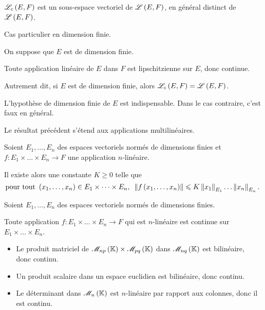 \begin{prop}
\(\mathscr{L}_c\left(E,F\right)\) est un sous-espace vectoriel de \(\mathscr{L}\left(E,F\right)\), en général distinct de \(\mathscr{L}\left(E,F\right)\).
\end{prop}

Cas particulier en dimension finie.

\begin{theo}
On suppose que \(E\) est de dimension finie.

Toute application linéaire de \(E\) dans \(F\) est lipschitzienne sur \(E\), donc continue.

Autrement dit, si \(E\) est de dimension finie, alors \(\mathscr{L}_c\left(E,F\right)=\mathscr{L}\left(E,F\right)\).
\end{theo}

\begin{rem}
L'hypothèse de dimension finie de \(E\) est indispensable. Dans le cas contraire, c'est faux en général.
\end{rem}

Le résultat précédent s'étend aux applications multilinéaires.

\begin{theo}
Soient \(E_1,\dots,E_n\) des espaces vectoriels normés de dimensions finies et \(f:E_1\times\dots\times E_n\to F\) une application \(n\)-linéaire.

Il existe alors une constante \(K\geq0\) telle que \[\quantifs{\tpt\paren{x_1,\dots,x_n}\in E_1\times\dots\times E_n}\norme{f\paren{x_1,\dots,x_n}}\leq K\norme{x_1}_{E_1}\dots\norme{x_n}_{E_n}.\]
\end{theo}

\begin{cor}
Soient \(E_1,\dots,E_n\) des espaces vectoriels normés de dimensions finies.

Toute application \(f:E_1\times\dots\times E_n\to F\) qui est \(n\)-linéaire est continue sur \(E_1\times\dots\times E_n\).
\end{cor}

\begin{ex}
\begin{itemize}
    \item Le produit matriciel de \(\M{np}\times\M{pq}\) dans \(\M{nq}\) est bilinéaire, donc continu. \\
    \item Un produit scalaire dans un espace euclidien est bilinéaire, donc continu. \\
    \item Le déterminant dans \(\M{n}\) est \(n\)-linéaire par rapport aux colonnes, donc il est continu.
\end{itemize}
\end{ex}

